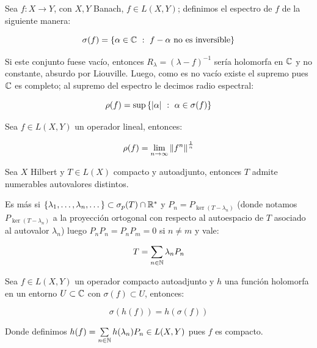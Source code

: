 \begin{definition}
	Sea $f : X \rightarrow Y$, con $X,Y$ Banach, $f \in L(X,Y)$; definimos el espectro de $f$ de la siguiente manera:
	
	\begin{equation*}
		\sigma(f) = \left\lbrace\alpha \in \mathbb{C} ~:~ f- \alpha \text{ no es inversible}\right\rbrace
	\end{equation*}
	
	Si este conjunto fuese vac\'io, entonces $R_{\lambda} = \left(\lambda -f\right)^{-1}$ ser\'ia holomorfa en $\mathbb{C}$ y no constante, absurdo por Liouville. Luego, como es no vac\'io existe el supremo pues $\mathbb{C}$ es completo; al supremo del espectro le decimos radio espectral:
	
	\begin{equation*}
	\rho(f) = \sup \left\lbrace\left\lvert\alpha\right\rvert ~:~ \alpha \in \sigma(f)\right\rbrace
	\end{equation*}
	
\end{definition}

\begin{proposition}
	\label{prop: teorema de gelfand}
	Sea $f \in L(X,Y)$ un operador lineal, entonces:
	
	\begin{equation*}
		\rho(f) = \lim\limits_{n \to \infty} \left\lVert f^n\right\rVert^{\frac{1}{n}}
	\end{equation*}
	
\end{proposition}

\begin{theorem}
	Sea $X$ Hilbert y $T \in L(X)$ compacto y autoadjunto, entonces $T$ admite numerables autovalores distintos. 
	
	Es m\'as si $\left\lbrace\lambda_1, \dots, \lambda_n, \dots\right\rbrace \subset \sigma_p(T) \cap {\mathbb{R}}^{\ast}$ y $P_n = P_{\ker(T-\lambda_n)}$ (donde notamos $P_{\ker(T-\lambda_n)}$ a la proyecci\'on ortogonal con respecto al autoespacio de $T$ asociado al autovalor $\lambda_n$) luego $P_nP_n = P_nP_m = 0$ si $n \neq m$ y vale:
	
	\begin{equation}
	\label{eq: Teorema espectral}
	T = \sum\limits_{n \in {\mathbb{N}}}{\lambda_n P_n}
	\end{equation}
\end{theorem}

\begin{proposition}
	\label{prop: calculo funcional}
	
	Sea $f \in L(X,Y)$ un operador compacto autoadjunto y $h$ una funci\'on holomorfa en un entorno $U \subset \mathbb{C}$ con $\sigma(f) \subset U$, entonces:
	
	\begin{equation*}
		\sigma \left(h(f)\right) = h(\sigma(f))
	\end{equation*}
	
	Donde definimos $h(f) = \sum\limits_{n \in {\mathbb{N}}}{h(\lambda_n) P_n} \in L(X,Y)$ pues $f$ es compacto.
	
\end{proposition}

